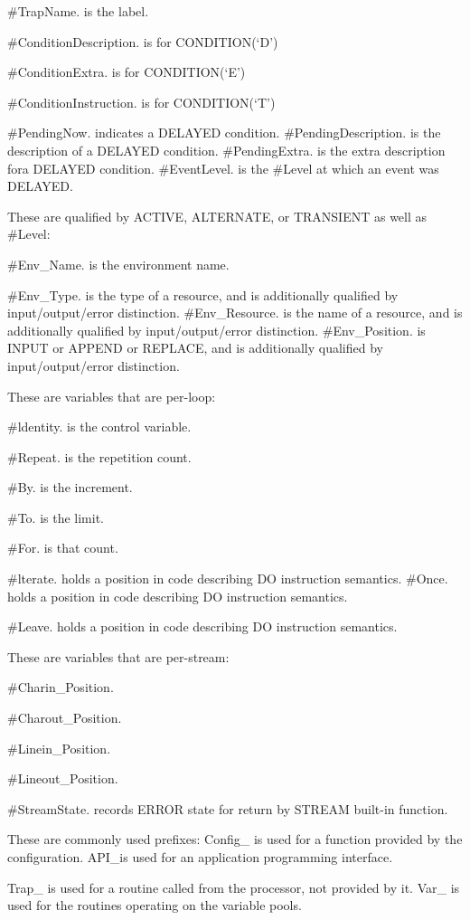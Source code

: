 \#TrapName. is the label.

\#ConditionDescription. is for CONDITION(`D')

\#ConditionExtra. is for CONDITION(`E')

\#ConditionInstruction. is for CONDITION(`T')

\#PendingNow. indicates a DELAYED condition. \#PendingDescription. is
the description of a DELAYED condition. \#PendingExtra. is the extra
description fora DELAYED condition. \#EventLevel. is the \#Level at
which an event was DELAYED.

These are qualified by ACTIVE, ALTERNATE, or TRANSIENT as well as
\#Level:

\#Env\_Name. is the environment name.

\#Env\_Type. is the type of a resource, and is additionally qualified by
input/output/error distinction. \#Env\_Resource. is the name of a
resource, and is additionally qualified by input/output/error
distinction. \#Env\_Position. is INPUT or APPEND or REPLACE, and is
additionally qualified by input/output/error distinction.

These are variables that are per-loop:

\#ldentity. is the control variable.

\#Repeat. is the repetition count.

\#By. is the increment.

\#To. is the limit.

\#For. is that count.

\#lterate. holds a position in code describing DO instruction semantics.
\#Once. holds a position in code describing DO instruction semantics.

\#Leave. holds a position in code describing DO instruction semantics.

These are variables that are per-stream:

\#Charin\_Position.

\#Charout\_Position.

\#Linein\_Position.

\#Lineout\_Position.

\#StreamState. records ERROR state for return by STREAM built-in
function.

These are commonly used prefixes: Config\_ is used for a function
provided by the configuration. API\_is used for an application
programming interface.

Trap\_ is used for a routine called from the processor, not provided by
it. Var\_ is used for the routines operating on the variable pools.

